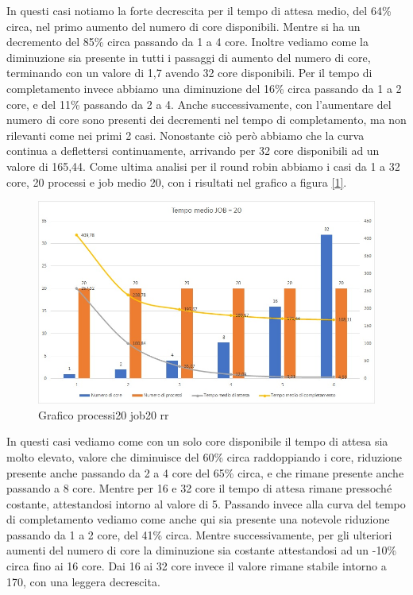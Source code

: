 \documentclass[Lau, oneside]{sapthesis}%
\begin{document}
In questi casi notiamo la forte decrescita per il tempo di attesa medio, del 64\% circa, nel primo aumento del numero di core disponibili.
Mentre si ha un decremento del 85\% circa passando da 1 a 4 core.
Inoltre vediamo come la diminuzione sia presente in tutti i passaggi di aumento del numero di core, terminando con un valore di 1,7 avendo 32 core disponibili.
Per il tempo di completamento invece abbiamo una diminuzione del 16\% circa passando da 1 a 2 core, e del 11\% passando da 2 a 4.
Anche successivamente, con l'aumentare del numero di core sono presenti dei decrementi nel tempo di completamento, ma non rilevanti come nei primi 2 casi.
Nonostante ciò però abbiamo che la curva continua a deflettersi continuamente, arrivando per 32 core disponibili ad un valore di 165,44.
Come ultima analisi per il round robin abbiamo i casi da 1 a 32 core, 20 processi e job medio 20, con i risultati nel grafico a figura \hyperref[figura:p20j20rr]{[\ref*{figura:p20j20rr}]}.
\begin{figure}[ht!]
  \centering
  \includegraphics[width=1\textwidth]{Grafico processi20 job20 rr.jpg}
  \caption{Grafico processi20 job20 rr}
  \label{figura:p20j20rr}
\end{figure}
In questi casi vediamo come con un solo core disponibile il tempo di attesa sia molto elevato, valore che diminuisce del 60\% circa raddoppiando i core, riduzione presente anche passando da 2 a 4 core del 65\% circa, e che rimane presente anche passando a 8 core.
Mentre per 16 e 32 core il tempo di attesa rimane pressoché costante, attestandosi intorno al valore di 5.
Passando invece alla curva del tempo di completamento vediamo come anche qui sia presente una notevole riduzione passando da 1 a 2 core, del 41\% circa.
Mentre successivamente, per gli ulteriori aumenti del numero di core la diminuzione sia costante attestandosi ad un -10\% circa fino ai 16 core.
Dai 16 ai 32 core invece il valore rimane stabile intorno a 170, con una leggera decrescita.
\end{document}

